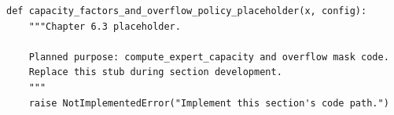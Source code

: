 \begin{lstlisting}[style=bookpython,caption={Planned code placeholder for capacity factors and overflow policy.},label={lst:ch06-capacity-factors-and-overflow-policy}]
def capacity_factors_and_overflow_policy_placeholder(x, config):
    """Chapter 6.3 placeholder.

    Planned purpose: compute_expert_capacity and overflow mask code.
    Replace this stub during section development.
    """
    raise NotImplementedError("Implement this section's code path.")
\end{lstlisting}
